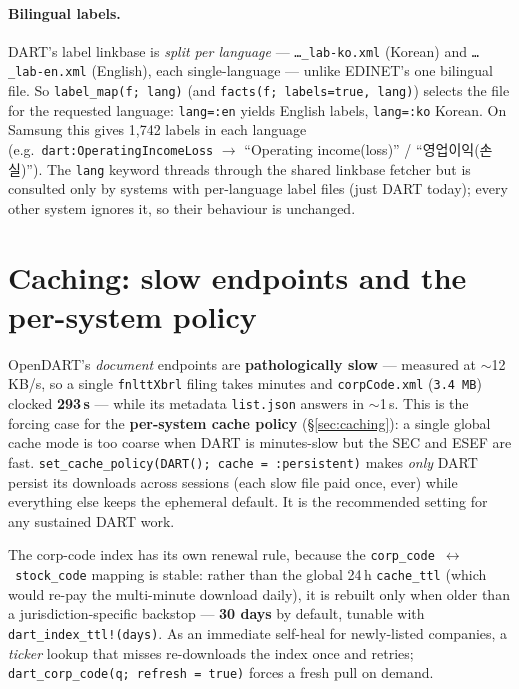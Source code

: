 \documentclass[11pt,a4paper]{report}
\newcommand{\krcjk}[2]{{\cjkKRfont #1}}
\begin{document}
\paragraph{Bilingual labels.} DART's label linkbase is \emph{split per language} ---
\texttt{\ldots\_lab-ko.xml} (Korean) and \texttt{\ldots\_lab-en.xml} (English), each single-language ---
unlike EDINET's one bilingual file. So \texttt{label\_map(f;\ lang)} (and \texttt{facts(f;\ labels=true,\
lang)}) selects the file for the requested language: \texttt{lang=:en} yields English labels,
\texttt{lang=:ko} Korean. On Samsung this gives 1{,}742 labels in each language (e.g.\
\texttt{dart:OperatingIncomeLoss} \(\to\) ``Operating income(loss)'' / ``\krcjk{영업이익(손실)}{yeongeop iik (sonsil)}'').
The \texttt{lang} keyword threads through the shared linkbase fetcher but is consulted only by systems
with per-language label files (just DART today); every other system ignores it, so their behaviour is
unchanged.

\section{Caching: slow endpoints and the per-system policy}\label{sec:dart-caching}

OpenDART's \emph{document} endpoints are \textbf{pathologically slow} --- measured at $\sim$12\,KB/s, so a
single \texttt{fnlttXbrl} filing takes minutes and \texttt{corpCode.xml} (\texttt{3.4\,MB}) clocked
\textbf{293\,s} --- while its metadata \texttt{list.json} answers in $\sim$1\,s. This is the forcing case
for the \textbf{per-system cache policy} (\S\ref{sec:caching}): a single global cache mode is too coarse
when DART is minutes-slow but the SEC and ESEF are fast. \texttt{set\_cache\_policy(DART();\
cache\ =\ :persistent)} makes \emph{only} DART persist its downloads across sessions (each slow file paid
once, ever) while everything else keeps the ephemeral default. It is the recommended setting for any
sustained DART work.

The corp-code index has its own renewal rule, because the
\texttt{corp\_code\ $\leftrightarrow$\ stock\_code} mapping is stable: rather than the global 24\,h
\texttt{cache\_ttl} (which would re-pay the multi-minute download daily), it is rebuilt only when older
than a jurisdiction-specific backstop --- \textbf{30 days} by default, tunable with
\texttt{dart\_index\_ttl!(days)}. As an immediate self-heal for newly-listed companies, a \emph{ticker}
lookup that misses re-downloads the index once and retries; \texttt{dart\_corp\_code(q;\ refresh\ =\
true)} forces a fresh pull on demand.
\end{document}
